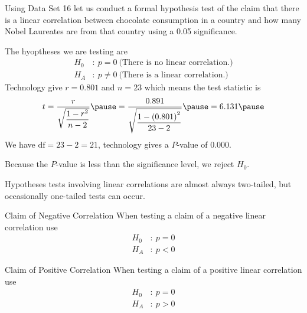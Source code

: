 \documentclass{beamer}
\newcommand{\nullhypothesis}[1]{H_0&:~{#1}}
\newcommand{\althypothesis}[1]{H_A&:~{#1}}
\begin{document}
\begin{frame}
\begin{example}
Using Data Set 16 let us conduct a formal hypothesis test of the claim that there is a linear correlation between chocolate consumption in a country and how many Nobel Laureates are from that country using a 0.05 significance.\pause

\vspace{1mm}
The hyoptheses we are testing are
\begin{equation*}
\begin{aligned}
\nullhypothesis{p=0~\text{(There is no linear correlation.)}} \\
\althypothesis{p\neq 0~\text{(There is a linear correlation.)}}
\end{aligned}
\end{equation*}\pause
Technology give $r=0.801$ and $n=23$ which means the test statistic is
\begin{equation*}
t=\dfrac{r}{\sqrt{\dfrac{1-r^2}{n-2}}}\pause
=\dfrac{0.891}{\sqrt{\dfrac{1-{(0.801)}^2}{23-2}}}\pause
=6.131\pause
\end{equation*}
We have $\text{df}=23-2=21$, technology gives a $P$-value of 0.000.\pause

\vspace{1mm}
Because the $P$-value is less than the significance level, we reject $H_0$.
\end{example}
\end{frame}

\begin{frame}
\begin{note}
Hypotheses tests involving linear correlations are almost always two-tailed, but occasionally one-tailed tests can occur.
\end{note}\pause

\begin{block}{Claim of Negative Correlation}
When testing a claim of a negative linear correlation use
\begin{equation*}
\begin{aligned}
\nullhypothesis{p=0}\\
\althypothesis{p<0}
\end{aligned}
\end{equation*}
\end{block}\pause

\begin{block}{Claim of Positive Correlation}
When testing a claim of a positive linear correlation use
\begin{equation*}
\begin{aligned}
\nullhypothesis{p=0}\\
\althypothesis{p>0}
\end{aligned}
\end{equation*}
\end{block}
\end{frame}
\end{document}
